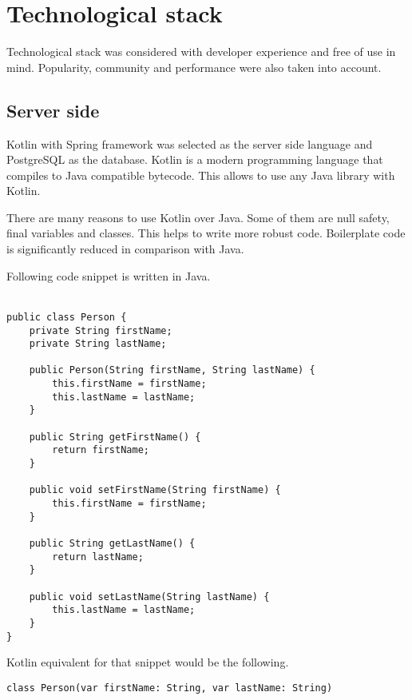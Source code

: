 
\section{Technological stack}\label{sec:technological-stack}

Technological stack was considered with developer experience and free of use in mind.
Popularity, community and performance were also taken into account.

\subsection{Server side}\label{subsec:ts-server-side}

Kotlin with Spring framework was selected as the server side language and PostgreSQL as the database.\cite{kotlin, spring, postgresql}
Kotlin is a modern programming language that compiles to Java compatible bytecode.
This allows to use any Java library with Kotlin.

There are many reasons to use Kotlin over Java.
Some of them are null safety, final variables and classes.
This helps to write more robust code.
Boilerplate code is significantly reduced in comparison with Java.

Following code snippet is written in Java.\\
\\
\begin{Verbatim}[frame=single]
public class Person {
    private String firstName;
    private String lastName;

    public Person(String firstName, String lastName) {
        this.firstName = firstName;
        this.lastName = lastName;
    }

    public String getFirstName() {
        return firstName;
    }

    public void setFirstName(String firstName) {
        this.firstName = firstName;
    }

    public String getLastName() {
        return lastName;
    }

    public void setLastName(String lastName) {
        this.lastName = lastName;
    }
}
\end{Verbatim}

Kotlin equivalent for that snippet would be the following.\\
\begin{Verbatim}[frame=single]
class Person(var firstName: String, var lastName: String)
\end{Verbatim}

